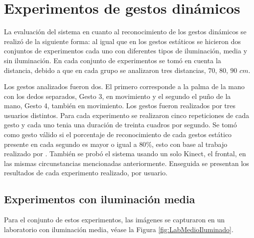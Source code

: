 \section{Experimentos de gestos dinámicos}\label{TestDinamicGestures} 

La evaluación del sistema en cuanto al reconocimiento de los gestos dinámicos se realiz\'o de la siguiente forma: al igual que en los gestos estáticos se hicieron dos conjuntos de experimentos cada uno con diferentes tipos de iluminación, media y sin iluminación. En cada conjunto de experimentos se tom\'o en cuenta la distancia, debido a que en cada grupo se analizaron tres distancias, $70$, $80$, $90$ $cm$. 

Los gestos analizados fueron dos. El primero corresponde a la palma de la mano con los dedos separados, Gesto 3, en movimiento y el segundo el puño de la mano, Gesto 4, también en movimiento. Los gestos fueron realizados por tres usuarios distintos. Para cada experimento se realizaron cinco repeticiones de cada gesto y cada uno tenia una duración de treinta cuadros por segundo. Se tom\'o como gesto v\'alido si el porcentaje de reconocimiento de cada gestos estático presente en cada segundo es mayor o igual a $80 \%$, esto con base al trabajo realizado por \citep{Sultana2012}. 
También se prob\'o el sistema usando un solo Kinect, el frontal, en las mismas circunstancias mencionadas anteriormente. 
Enseguida se presentan los resultados de cada experimento realizado, por usuario. 


\subsection{Experimentos con iluminación media} 
Para el conjunto de estos experimentos, las imágenes se capturaron en un laboratorio con iluminación media, véase la Figura \ref{fig:LabMedioIluminado}.

